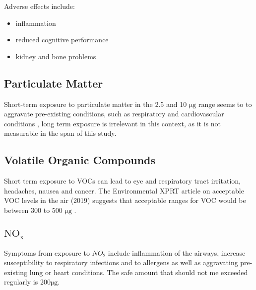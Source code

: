 \noindent
Adverse effects include\cite{co2effects}:
\begin{itemize}
	\item inflammation
	\item reduced cognitive performance
	\item kidney and bone problems
\end{itemize}


\subsection{Particulate Matter}
Short-term exposure to particulate matter in the 2.5 and 10 $ \si{\micro\gram} $ range seems to to aggravate pre-existing conditions, such as respiratory and cardiovascular conditions \cite{pmparticles}, long term exposure is irrelevant in this context, as it is not measurable in the span of this study.


\subsection{Volatile Organic Compounds}
Short term exposure to VOCs can lead to eye and respiratory tract irritation, headaches, nausea and cancer\cite{safevocs}.
The Environmental XPRT article on acceptable VOC levels in the air (2019) \cite{vocs} suggests that acceptable ranges for VOC would be between 300 to 500 $ \si{\micro\gram} $ .

\subsection{$\mathrm{NO_x}$}
Symptoms from exposure to $NO_2$ include inflammation of the airways, increase susceptibility to respiratory infections and to allergens as well as aggravating pre-existing lung or heart conditions. The safe amount that should not me exceeded regularly is 200$ \si{\micro\gram} $.\cite{safenox}




